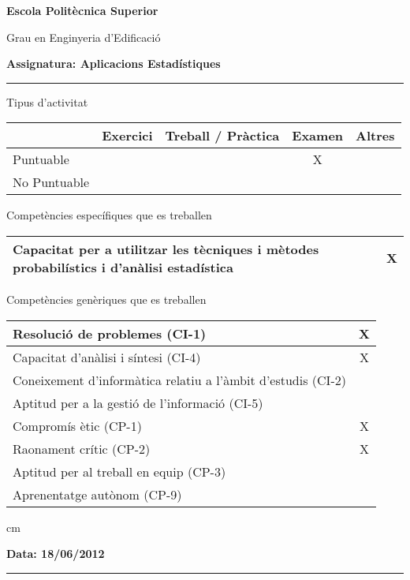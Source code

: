 \documentclass[a4paper,12pt]{article}
\begin{document}
\noindent
{\large \bf Escola Politècnica Superior}

\noindent
{\large Grau en Enginyeria d'Edificació}

\vskip 0.3cm
\noindent
{\large \bf Assignatura: Aplicacions Estadístiques}

\hrule

\vskip 0.3cm

{ \footnotesize

\noindent
Tipus d'activitat

\begin{tabular}{|l|c|c|c|c|}
\hline
 & Exercici & Treball / Pràctica & Examen & Altres \\
\hline
Puntuable & & & X & \\ \hline
No Puntuable & & & & \\ \hline
\end{tabular}

\vskip 0.3cm

\noindent
Competències específiques que es treballen

\begin{tabular}{|l|c|}
\hline
Capacitat per a utilitzar les tècniques i mètodes probabilístics i d'anàlisi estadística & X \\
\hline
\end{tabular}

\vskip 0.3cm

\noindent
Competències genèriques que es treballen

\begin{tabular}{|l|c|}
\hline
Resolució de problemes (CI-1) & X \\ \hline
Capacitat d'anàlisi i síntesi (CI-4) & X \\ \hline
Coneixement d'informàtica relatiu a l'àmbit d'estudis (CI-2) & \\ \hline
Aptitud per a la gestió de l'informació (CI-5) & \\ \hline
Compromís ètic (CP-1) & X \\ \hline
Raonament crític (CP-2) & X \\ \hline
Aptitud per al treball en equip (CP-3) & \\ \hline
Aprenentatge autònom (CP-9) & \\ \hline
\end{tabular}

}
 cm

\noindent
\textbf{Data: 18/06/2012}

\hrule
\end{document}
